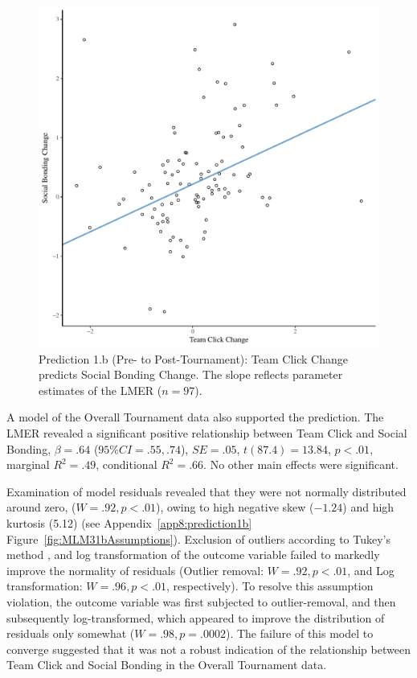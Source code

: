 \begin{CJK}{UTF8}{gbsn}
  \begin{figure}[htbp]
    \centering
  \includegraphics[scale=.5]{images/clickBondDeltaModelSlope.pdf}
    \caption{Prediction 1.b (Pre- to Post-Tournament): Team Click Change predicts Social Bonding Change. The slope reflects parameter estimates of the LMER ($n = 97$).}
    \label{fig:clickBondDeltaModelSlope}
  \end{figure}


A model of the Overall Tournament data also supported the prediction. The LMER revealed a significant positive relationship between Team Click and Social Bonding, $\beta = .64$ ($95\% CI = .55, .74$), $SE = .05$, $t(87.4) = 13.84$, $p < .01$, marginal $R^2 = .49$, conditional $R^2 = .66$. No other main effects were significant.

Examination of model residuals revealed that they were not normally distributed around zero, ($W = .92, p < .01$), owing to high negative skew ($-1.24$) and high kurtosis (5.12) (see Appendix~\ref{app8:prediction1b} Figure~\ref{fig:MLM31bAssumptions}).  Exclusion of outliers according to Tukey's method \citep[observations above and below 1.5x the Inter Quartile Range (IQR); see][]{Tukey1977}, and log transformation of the outcome variable  failed to markedly improve the normality of residuals (Outlier removal: $W = .92, p < .01$, and Log transformation: $W = .96, p < .01$, respectively).  To resolve this assumption violation, the outcome variable was first subjected to outlier-removal, and then subsequently log-transformed, which appeared to improve the distribution of residuals only somewhat ($W = .98, p = .0002$).
The failure of this model to converge suggested that it was not a robust indication of the relationship between Team Click and Social Bonding in the Overall Tournament data.


\end{CJK}
